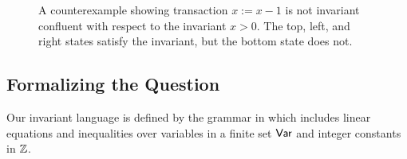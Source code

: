 \begin{figure}[h]
  \centering
  \caption{
    A counterexample showing transaction $x := x - 1$ is not invariant
    confluent with respect to the invariant $x > 0$. The top, left, and right
    states satisfy the invariant, but the bottom state does not.
  }
  \label{fig:decrement}
\end{figure}

\subsection{Formalizing the Question}\label{sec:counter-question}
Our invariant language is defined by the grammar in 
which includes linear equations and inequalities over variables in a finite set
$\textsf{Var}$ and integer constants in $\mathbb{Z}$.

